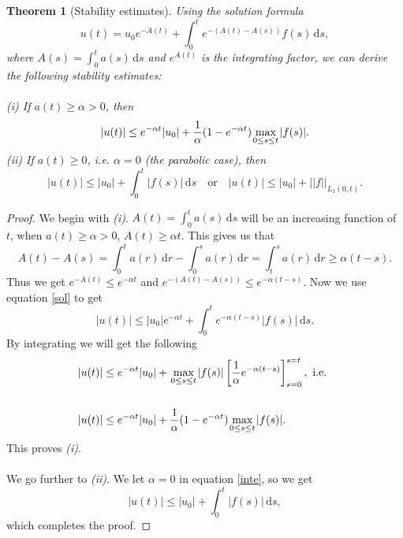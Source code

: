 \documentclass[12pt, a4paper]{article}
\newcommand{\rd}{\ensuremath{\mathrm{d}}}
\newcommand{\id}{\ensuremath{\,\rd}}
\newtheorem{theorem}{Theorem}[section]
\numberwithin{equation}{section}
\begin{document}
\begin{theorem}[Stability estimates]
Using the solution formula
\begin{equation}
\label{sol}
u(t) = u_0e^{-A(t)} + \int_0^t e^{-(A(t)-A(s))}f(s)\id s,
\end{equation}
where $A(s) = \int_0^t a(s) \id s$ and $e^{A(t)}$ is the integrating factor, we can derive the following stability estimates:
\\\\
(i) If $a(t)\geq \alpha > 0 $, then 
\begin{equation*}
|u(t)|\leq e^{-\alpha t}|u_0|+\frac{1}{\alpha}(1-e^{-\alpha t})\underset{0\leq s \leq t}{\text{\normalfont{ max }}} |f(s)|.
\end{equation*}
(ii) If $a(t)\geq 0$, i.e. $\alpha = 0$ (the parabolic case), then 
\begin{equation*}
|u(t)|\leq |u_0| + \int_0^t|f(s)|\id s \quad \text{or} \quad |u(t)|\leq |u_0|+||f||_{L_1(0,t)}.
\end{equation*}
\end{theorem}
\begin{proof}
We begin with \textit{(i)}. $A(t)=\int_0^t a(s)\id s$ will be an increasing function of $t$, when $a(t)\geq\alpha >0$, $A(t)\geq \alpha t$. This gives us that
\begin{equation*}
A(t)-A(s) = \int_0^t a(r) \id r - \int_0^s a(r) \id r = \int_t^s a(r) \id r \geq \alpha(t-s).
\end{equation*}
Thus we get $e^{-A(t)}\leq e^{-\alpha t}$ and $e^{-(A(t)-A(s))}\leq e^{-\alpha (t-s)}$. Now we use equation \eqref{sol} to get
\begin{equation}
\label{inte}
|u(t)|\leq |u_0|e^{-\alpha t}+\int_0^t e^{-\alpha (t-s)}|f(s)|\id s.
\end{equation}
By integrating we will get the following
\begin{equation*}
\begin{aligned}
&|u(t)|\leq e^{-\alpha t}|u_0| + \underset{0\leq s \leq t}{\text{\normalfont{ max }}} |f(s)| \left [ \frac{1}{\alpha}e^{-\alpha (t-s)}\right ]_{s=0}^{s=t}, \text{ i.e. }
\\\\
&|u(t)|\leq e^{-\alpha t}|u_0|+\frac{1}{\alpha}(1-e^{-\alpha t})\underset{0\leq s \leq t}{\text{\normalfont{ max }}} |f(s)|.
\end{aligned}
\end{equation*}
This proves \textit{(i)}.
\\\\
We go further to \textit{(ii)}. We let $\alpha=0$ in equation \eqref{inte}, so we get
\begin{equation*}
|u(t)|\leq |u_0| + \int_0^t |f(s)|\id s,
\end{equation*}
which completes the proof.
\end{proof}
\end{document}
